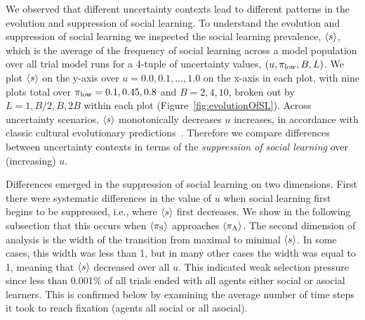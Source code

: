 \documentclass[letterpaper,11.5pt]{scrartcl}
\begin{document}
We observed that different uncertainty contexts lead to different patterns in
the evolution and suppression of social learning. To understand the evolution
and suppression of social learning we inspected the social learning prevalence,
$\langle s \rangle$, which is the average of the frequency of social learning across
a model population over all trial model runs for a 4-tuple of uncertainty
values, $(u, \pi_{\mathrm{low}}, B, L)$.  We plot $\langle s \rangle$ on the y-axis 
over $u=0.0,0.1,\ldots,1.0$ on the x-axis in each plot, with nine plots total over
$\pi_{\mathrm{low}}=0.1,0.45,0.8$ and $B=2,4,10$, broken out by $L=1,B/2,B,2B$ within each plot
(Figure~\ref{fig:evolutionOfSL}). Across uncertainty scenarios, $\langle s \rangle$ monotonically
decreases $u$ increases, in accordance with classic cultural evolutionary
predictions~\cite{CavalliFeldman1981,BoydRicherson1985,Feldman1996}.  Therefore we compare
differences between uncertainty contexts in terms of the \emph{suppression of social learning}
over (increasing) $u$. 

Differences emerged in the suppression of social learning on two dimensions.
First there were systematic differences in the value of $u$ when social
learning first begins to be suppressed, i.e., where $\langle s \rangle$ first decreases. We show
in the following subsection that this occurs when $\langle \pi_\mathrm{S} \rangle$ approaches $\langle \pi_\mathrm{A} \rangle$.
The second dimension of analysis is the width of the transition from 
maximal to minimal $\langle s \rangle$. In some cases, this width was less than 1, but
in many other cases the width was equal to 1, meaning that $\langle s \rangle$ 
decreased over all $u$. This indicated weak selection pressure since 
less than 0.001\% of all trials ended with all agents either social or asocial
learners. This is confirmed below by examining the average number of time steps
it took to reach fixation (agents all social or all asocial).
\end{document}
